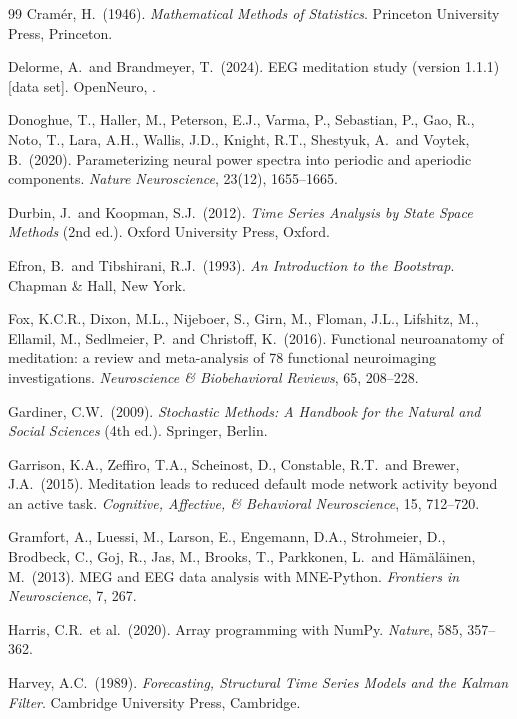 \documentclass[12pt,a4paper]{article}
\theoremstyle{plain}
\theoremstyle{definition}
\theoremstyle{remark}
\begin{document}
\begin{thebibliography}{99}
Cram\'er, H.\ (1946).
\textit{Mathematical Methods of Statistics}. Princeton University Press, Princeton.

Delorme, A.\ and Brandmeyer, T.\ (2024).
EEG meditation study (version 1.1.1) [data set].
OpenNeuro, .

Donoghue, T., Haller, M., Peterson, E.J., Varma, P., Sebastian, P., Gao, R., Noto, T., Lara, A.H., Wallis, J.D., Knight, R.T., Shestyuk, A.\ and Voytek, B.\ (2020).
Parameterizing neural power spectra into periodic and aperiodic components.
\textit{Nature Neuroscience}, 23(12), 1655--1665.

Durbin, J.\ and Koopman, S.J.\ (2012).
\textit{Time Series Analysis by State Space Methods} (2nd ed.). Oxford University Press, Oxford.

Efron, B.\ and Tibshirani, R.J.\ (1993).
\textit{An Introduction to the Bootstrap}. Chapman \& Hall, New York.

Fox, K.C.R., Dixon, M.L., Nijeboer, S., Girn, M., Floman, J.L., Lifshitz, M., Ellamil, M., Sedlmeier, P.\ and Christoff, K.\ (2016).
Functional neuroanatomy of meditation: a review and meta-analysis of 78 functional neuroimaging investigations.
\textit{Neuroscience \& Biobehavioral Reviews}, 65, 208--228.

Gardiner, C.W.\ (2009).
\textit{Stochastic Methods: A Handbook for the Natural and Social Sciences} (4th ed.). Springer, Berlin.

Garrison, K.A., Zeffiro, T.A., Scheinost, D., Constable, R.T.\ and Brewer, J.A.\ (2015).
Meditation leads to reduced default mode network activity beyond an active task.
\textit{Cognitive, Affective, \& Behavioral Neuroscience}, 15, 712--720.

Gramfort, A., Luessi, M., Larson, E., Engemann, D.A., Strohmeier, D., Brodbeck, C., Goj, R., Jas, M., Brooks, T., Parkkonen, L.\ and H\"am\"al\"ainen, M.\ (2013).
MEG and EEG data analysis with MNE-Python.
\textit{Frontiers in Neuroscience}, 7, 267.

Harris, C.R.\ et al.\ (2020).
Array programming with NumPy.
\textit{Nature}, 585, 357--362.

Harvey, A.C.\ (1989).
\textit{Forecasting, Structural Time Series Models and the Kalman Filter}. Cambridge University Press, Cambridge.


\end{thebibliography}
\end{document}
